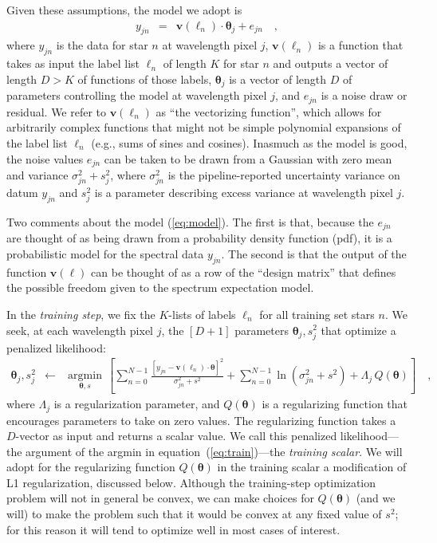 \documentclass[12pt,preprint]{aastex}
\newcommand{\Dvector}[1]{\boldsymbol{#1}}
\newcommand{\vectheta}{\Dvector{\theta}}
\newcommand{\vecv}{\Dvector{v}}
\newcommand{\argmin}[1]{\underset{#1}{\operatorname{argmin}}\,}
\begin{document}
\noindent{}Given these assumptions, the model we adopt is
\begin{eqnarray}
  y_{jn} &=& \vecv(\ell_n)\cdot\vectheta_j + e_{jn}
  \label{eq:model}\quad ,
\end{eqnarray}
where $y_{jn}$ is the data for star $n$ at wavelength pixel $j$, $\vecv(\ell_n)$
is a function that takes as input the label list $\ell_n$ of length $K$ for star
$n$ and outputs a vector of length $D>K$ of functions of those labels,
$\vectheta_j$ is a vector of length $D$ of parameters controlling the model at 
wavelength pixel $j$, and $e_{jn}$ is a noise draw or residual.  We refer to 
$\vecv(\ell_n)$ as ``the vectorizing function'', which allows for arbitrarily 
complex functions that might not be simple polynomial expansions of the label 
list $\ell_n$ (e.g., sums of sines and cosines).  Inasmuch as the model is good,
the noise values $e_{jn}$ can be taken to be drawn from a Gaussian with zero 
mean and variance $\sigma^2_{jn}+s^2_j$, where $\sigma^2_{jn}$ is the 
pipeline-reported uncertainty variance on datum $y_{jn}$ and $s^2_j$ is a 
parameter describing excess variance at wavelength pixel $j$.


Two comments about the model (\ref{eq:model}).  The first is that, because the 
$e_{jn}$ are thought of as being drawn from a probability density function (pdf),
it is a probabilistic model for the spectral data $y_{jn}$.  The second is that
the output of the function $\vecv(\ell)$ can be thought of as a row of the 
``design matrix'' that defines the possible freedom given to the spectrum 
expectation model.


In the \emph{training step}, we fix the $K$-lists of labels $\ell_n$ for all 
training set stars $n$.  We seek, at each wavelength pixel $j$, the $[D+1]$ 
parameters $\vectheta_j,s^2_j$ that optimize a penalized likelihood:
\begin{eqnarray}\label{eq:train}
  \vectheta_j,s^2_j &\leftarrow& \argmin{\vectheta,s}\left[
    \sum_{n=0}^{N-1} \frac{[y_{jn}-\vecv(\ell_n)\cdot\vectheta]^2}{\sigma^2_{jn}+s^2}
    + \sum_{n=0}^{N-1} \ln(\sigma^2_{jn}+s^2)
    + \Lambda_j\,Q(\vectheta)
    \right]
  \quad ,
\end{eqnarray}
where $\Lambda_j$ is a regularization parameter, and $Q(\vectheta)$ is a 
regularizing function that encourages parameters to take on zero values.  The 
regularizing function takes a $D$-vector as input and returns a scalar value.
We call this penalized likelihood---the argument of the argmin in 
equation~(\ref{eq:train})---the \emph{training scalar}.  We will adopt for the 
regularizing function $Q(\vectheta)$ in the training scalar a modification of L1
regularization, discussed below.  Although the training-step optimization 
problem will not in general be convex, we can make choices for $Q(\vectheta)$ 
(and we will) to make the problem such that it would be convex at any fixed 
value of $s^2$; for this reason it will tend to optimize well in most cases of 
interest.
\end{document}
